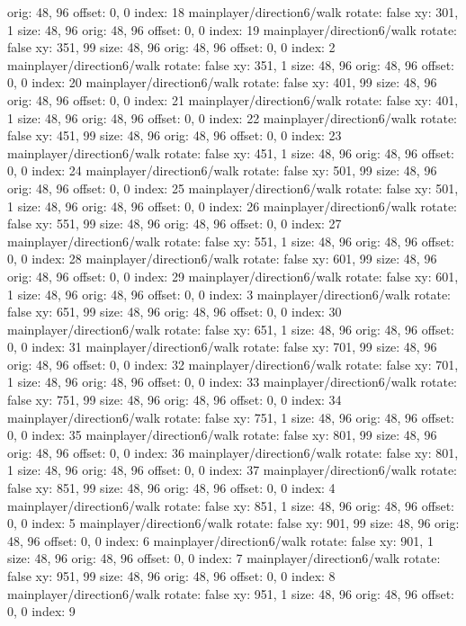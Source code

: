   orig: 48, 96
  offset: 0, 0
  index: 18
mainplayer/direction6/walk
  rotate: false
  xy: 301, 1
  size: 48, 96
  orig: 48, 96
  offset: 0, 0
  index: 19
mainplayer/direction6/walk
  rotate: false
  xy: 351, 99
  size: 48, 96
  orig: 48, 96
  offset: 0, 0
  index: 2
mainplayer/direction6/walk
  rotate: false
  xy: 351, 1
  size: 48, 96
  orig: 48, 96
  offset: 0, 0
  index: 20
mainplayer/direction6/walk
  rotate: false
  xy: 401, 99
  size: 48, 96
  orig: 48, 96
  offset: 0, 0
  index: 21
mainplayer/direction6/walk
  rotate: false
  xy: 401, 1
  size: 48, 96
  orig: 48, 96
  offset: 0, 0
  index: 22
mainplayer/direction6/walk
  rotate: false
  xy: 451, 99
  size: 48, 96
  orig: 48, 96
  offset: 0, 0
  index: 23
mainplayer/direction6/walk
  rotate: false
  xy: 451, 1
  size: 48, 96
  orig: 48, 96
  offset: 0, 0
  index: 24
mainplayer/direction6/walk
  rotate: false
  xy: 501, 99
  size: 48, 96
  orig: 48, 96
  offset: 0, 0
  index: 25
mainplayer/direction6/walk
  rotate: false
  xy: 501, 1
  size: 48, 96
  orig: 48, 96
  offset: 0, 0
  index: 26
mainplayer/direction6/walk
  rotate: false
  xy: 551, 99
  size: 48, 96
  orig: 48, 96
  offset: 0, 0
  index: 27
mainplayer/direction6/walk
  rotate: false
  xy: 551, 1
  size: 48, 96
  orig: 48, 96
  offset: 0, 0
  index: 28
mainplayer/direction6/walk
  rotate: false
  xy: 601, 99
  size: 48, 96
  orig: 48, 96
  offset: 0, 0
  index: 29
mainplayer/direction6/walk
  rotate: false
  xy: 601, 1
  size: 48, 96
  orig: 48, 96
  offset: 0, 0
  index: 3
mainplayer/direction6/walk
  rotate: false
  xy: 651, 99
  size: 48, 96
  orig: 48, 96
  offset: 0, 0
  index: 30
mainplayer/direction6/walk
  rotate: false
  xy: 651, 1
  size: 48, 96
  orig: 48, 96
  offset: 0, 0
  index: 31
mainplayer/direction6/walk
  rotate: false
  xy: 701, 99
  size: 48, 96
  orig: 48, 96
  offset: 0, 0
  index: 32
mainplayer/direction6/walk
  rotate: false
  xy: 701, 1
  size: 48, 96
  orig: 48, 96
  offset: 0, 0
  index: 33
mainplayer/direction6/walk
  rotate: false
  xy: 751, 99
  size: 48, 96
  orig: 48, 96
  offset: 0, 0
  index: 34
mainplayer/direction6/walk
  rotate: false
  xy: 751, 1
  size: 48, 96
  orig: 48, 96
  offset: 0, 0
  index: 35
mainplayer/direction6/walk
  rotate: false
  xy: 801, 99
  size: 48, 96
  orig: 48, 96
  offset: 0, 0
  index: 36
mainplayer/direction6/walk
  rotate: false
  xy: 801, 1
  size: 48, 96
  orig: 48, 96
  offset: 0, 0
  index: 37
mainplayer/direction6/walk
  rotate: false
  xy: 851, 99
  size: 48, 96
  orig: 48, 96
  offset: 0, 0
  index: 4
mainplayer/direction6/walk
  rotate: false
  xy: 851, 1
  size: 48, 96
  orig: 48, 96
  offset: 0, 0
  index: 5
mainplayer/direction6/walk
  rotate: false
  xy: 901, 99
  size: 48, 96
  orig: 48, 96
  offset: 0, 0
  index: 6
mainplayer/direction6/walk
  rotate: false
  xy: 901, 1
  size: 48, 96
  orig: 48, 96
  offset: 0, 0
  index: 7
mainplayer/direction6/walk
  rotate: false
  xy: 951, 99
  size: 48, 96
  orig: 48, 96
  offset: 0, 0
  index: 8
mainplayer/direction6/walk
  rotate: false
  xy: 951, 1
  size: 48, 96
  orig: 48, 96
  offset: 0, 0
  index: 9

